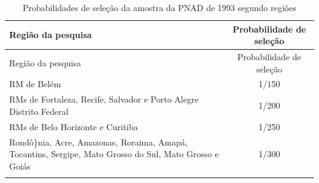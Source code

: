 \documentclass[]{book}
\numberwithin{example}{chapter}
\numberwithin{remark}{chapter}
\numberwithin{definition}{chapter}
\begin{document}
\begin{longtable}[]{@{}lc@{}}
\caption{\label{tab:proselpnad} Probabilidades de seleção da amostra da PNAD
de 1993 segundo regiões}\tabularnewline
\toprule
\begin{minipage}[b]{0.75\columnwidth}\raggedright\strut
Região da pesquisa\strut
\end{minipage} & \begin{minipage}[b]{0.19\columnwidth}\centering\strut
Probabilidade de seleção\strut
\end{minipage}\tabularnewline
\midrule
\endfirsthead
\toprule
\begin{minipage}[b]{0.75\columnwidth}\raggedright\strut
Região da pesquisa\strut
\end{minipage} & \begin{minipage}[b]{0.19\columnwidth}\centering\strut
Probabilidade de seleção\strut
\end{minipage}\tabularnewline
\midrule
\endhead
\begin{minipage}[t]{0.75\columnwidth}\raggedright\strut
RM de Belém\strut
\end{minipage} & \begin{minipage}[t]{0.19\columnwidth}\centering\strut
1/150\strut
\end{minipage}\tabularnewline
\begin{minipage}[t]{0.75\columnwidth}\raggedright\strut
RMs de Fortaleza, Recife, Salvador e Porto Alegre Distrito Federal\strut
\end{minipage} & \begin{minipage}[t]{0.19\columnwidth}\centering\strut
1/200\strut
\end{minipage}\tabularnewline
\begin{minipage}[t]{0.75\columnwidth}\raggedright\strut
RMs de Belo Horizonte e Curitiba\strut
\end{minipage} & \begin{minipage}[t]{0.19\columnwidth}\centering\strut
1/250\strut
\end{minipage}\tabularnewline
\begin{minipage}[t]{0.75\columnwidth}\raggedright\strut
Rondô\}nia, Acre, Amazonas, Roraima, Amapá, Tocantins, Sergipe, Mato
Grosso do Sul, Mato Grosso e Goiás\strut
\end{minipage} & \begin{minipage}[t]{0.19\columnwidth}\centering\strut
1/300\strut
\end{minipage}\tabularnewline
\begin{minipage}[t]{0.75\columnwidth}\raggedright\strut

\end{minipage}
\end{longtable}
\end{document}
